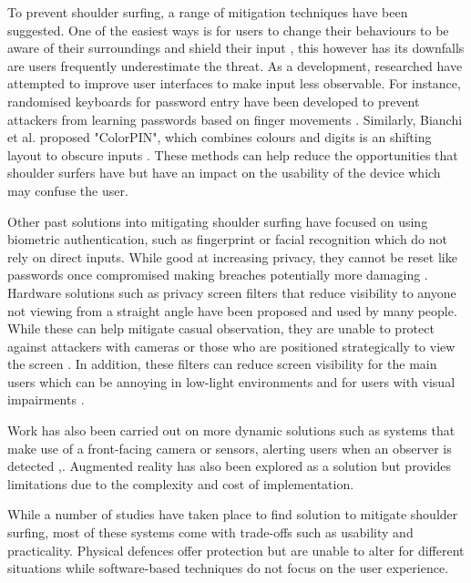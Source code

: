 \documentclass[12pt]{article}
\theoremstyle{plain}
\theoremstyle{definition}
\begin{document}
To prevent shoulder surfing, a range of mitigation techniques have been suggested. One of the easiest ways is for users to change their behaviours to be aware of their surroundings and shield their input \cite{brudy_is_2014}, this however has its downfalls are users frequently underestimate the threat. As a development, researched have attempted to improve user interfaces to make input less observable. For instance, randomised keyboards for password entry have been developed to prevent attackers from learning passwords based on finger movements \cite{tan_spy-resistant_2005}. Similarly, Bianchi et al. proposed "ColorPIN", which combines colours and digits is an shifting layout to obscure inputs \cite{de_luca_colorpin_2010}. These methods can help reduce the opportunities that shoulder surfers have but have an impact on the usability of the device which may confuse the user.

Other past solutions into mitigating shoulder surfing have focused on using biometric authentication, such as fingerprint or facial recognition which do not rely on direct inputs. While good at increasing privacy, they cannot be reset like passwords once compromised making breaches potentially more damaging \cite{jain_introduction_2011}. Hardware solutions such as privacy screen filters that reduce visibility to anyone not viewing from a straight angle have been proposed and used by many people. While these can help mitigate casual observation, they are unable to protect against attackers with cameras or those who are positioned strategically to view the screen \cite{eiband_understanding_2017}. In addition, these filters can reduce screen visibility for the main users which can be annoying in low-light environments and for users with visual impairments \cite{khan_usability_2015}.

Work has also been carried out on more dynamic solutions such as systems that make use of a front-facing camera or sensors, alerting users when an observer is detected \cite{bace_privacyscout_2022},\cite{brudy_is_2014}. Augmented reality has also been explored as a solution \cite{corbett_shouldar_2024} but provides limitations due to the complexity and cost of implementation.

While a number of studies have taken place to find solution to mitigate shoulder surfing, most of these systems come with trade-offs such as usability and practicality. Physical defences offer protection but are unable to alter for different situations while software-based techniques do not focus on the user experience.
\end{document}
